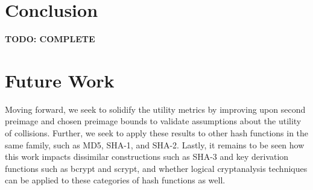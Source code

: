 \documentclass[conference]{IEEEtran}
\begin{document}
%






\section{Conclusion} \label{Sec:Conclusion}

\textbf{TODO: COMPLETE}


\section{Future Work} \label{Sec:Future}

Moving forward, we seek to solidify the utility metrics by improving upon
second preimage and chosen preimage bounds to validate assumptions about the
utility of collisions. Further, we seek to apply these results to other hash
functions in the same family, such as MD5, SHA-1, and SHA-2. Lastly, it
remains to be seen how this work impacts dissimilar constructions such as
SHA-3 and key derivation functions such as bcrypt and scrypt, and whether
logical cryptanalysis techniques can be applied to these categories of
hash functions as well.
\end{document}
